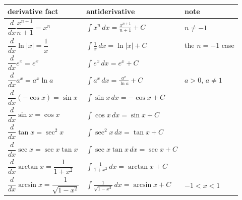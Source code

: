 \documentclass[11pt]{article}
\begin{document}
\smallskip
\begin{center}
\renewcommand{\arraystretch}{1.95}
\begin{tabular}{@{}l@{\qquad}l@{\qquad}l@{}}
\toprule
\textbf{derivative fact} & \textbf{antiderivative} & \textbf{note}\\
\midrule
$\dfrac{d}{dx}\dfrac{x^{n+1}}{n+1}=x^n$ & $\displaystyle\int x^n\,dx=\frac{x^{n+1}}{n+1}+C$ & $n\neq-1$\\
$\dfrac{d}{dx}\ln|x|=\dfrac1x$ & $\displaystyle\int\frac1x\,dx=\ln|x|+C$ & the $n=-1$ case\\
$\dfrac{d}{dx}e^x=e^x$ & $\displaystyle\int e^x\,dx=e^x+C$ & \\
$\dfrac{d}{dx}a^x=a^x\ln a$ & $\displaystyle\int a^x\,dx=\frac{a^x}{\ln a}+C$ & $a>0$, $a\neq1$\\
$\dfrac{d}{dx}(-\cos x)=\sin x$ & $\displaystyle\int\sin x\,dx=-\cos x+C$ & \\
$\dfrac{d}{dx}\sin x=\cos x$ & $\displaystyle\int\cos x\,dx=\sin x+C$ & \\
$\dfrac{d}{dx}\tan x=\sec^2x$ & $\displaystyle\int\sec^2x\,dx=\tan x+C$ & \\
$\dfrac{d}{dx}\sec x=\sec x\tan x$ & $\displaystyle\int\sec x\tan x\,dx=\sec x+C$ & \\
$\dfrac{d}{dx}\arctan x=\dfrac1{1+x^2}$ & $\displaystyle\int\frac1{1+x^2}\,dx=\arctan x+C$ & \\
$\dfrac{d}{dx}\arcsin x=\dfrac1{\sqrt{1-x^2}}$ & $\displaystyle\int\frac1{\sqrt{1-x^2}}\,dx=\arcsin x+C$ & $-1<x<1$\\
\bottomrule
\end{tabular}
\end{center}
\end{document}
